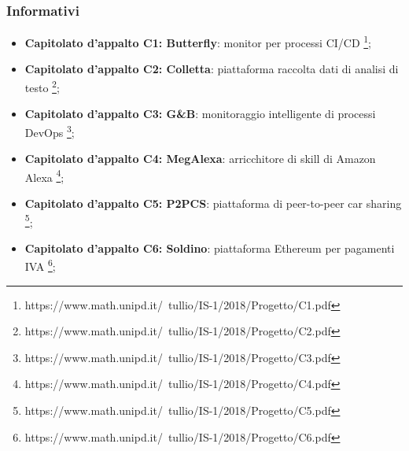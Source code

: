 \subsubsection{Informativi}
\begin{itemize}
	\item \textbf{Capitolato d'appalto C1: Butterfly}: monitor per processi CI/CD \footnote{https://www.math.unipd.it/~tullio/IS-1/2018/Progetto/C1.pdf};
	
	\item \textbf{Capitolato d'appalto C2: Colletta}: piattaforma raccolta dati di analisi di testo
	\footnote{https://www.math.unipd.it/~tullio/IS-1/2018/Progetto/C2.pdf};
	
	\item \textbf{Capitolato d'appalto C3: G\&B}: monitoraggio intelligente di processi DevOps 	\footnote{https://www.math.unipd.it/~tullio/IS-1/2018/Progetto/C3.pdf};
	
	\item \textbf{Capitolato d'appalto C4: MegAlexa}: arricchitore di skill di Amazon Alexa 
	\footnote{https://www.math.unipd.it/~tullio/IS-1/2018/Progetto/C4.pdf};
	
	\item \textbf{Capitolato d'appalto C5: P2PCS}: piattaforma di peer-to-peer car sharing 
	\footnote{https://www.math.unipd.it/~tullio/IS-1/2018/Progetto/C5.pdf};
	
	\item \textbf{Capitolato d'appalto C6: Soldino}: piattaforma Ethereum per pagamenti IVA 
	\footnote{https://www.math.unipd.it/~tullio/IS-1/2018/Progetto/C6.pdf};
\end{itemize}

	
	

